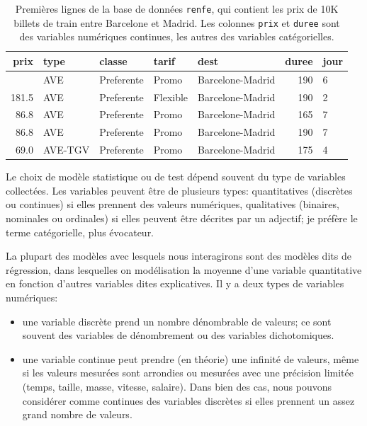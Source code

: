 \documentclass[
  11pt,
  letterpaper,
]{scrbook}
\providecommand{\tightlist}{%
  \setlength{\itemsep}{0pt}\setlength{\parskip}{0pt}}\usepackage{longtable,booktabs,array}
\theoremstyle{definition}
\theoremstyle{definition}
\theoremstyle{remark}
\begin{document}
\begin{longtable}[]{@{}rllllrl@{}}

\caption{\label{tbl-data-renfe}Premières lignes de la base de données
\texttt{renfe}, qui contient les prix de 10K billets de train entre
Barcelone et Madrid. Les colonnes \texttt{prix} et \texttt{duree} sont
des variables numériques continues, les autres des variables
catégorielles.}

\tabularnewline

\toprule\noalign{}
prix & type & classe & tarif & dest & duree & jour \\
\midrule\noalign{}
\endhead
\bottomrule\noalign{}
\endlastfoot
143.4 & AVE & Preferente & Promo & Barcelone-Madrid & 190 & 6 \\
181.5 & AVE & Preferente & Flexible & Barcelone-Madrid & 190 & 2 \\
86.8 & AVE & Preferente & Promo & Barcelone-Madrid & 165 & 7 \\
86.8 & AVE & Preferente & Promo & Barcelone-Madrid & 190 & 7 \\
69.0 & AVE-TGV & Preferente & Promo & Barcelone-Madrid & 175 & 4 \\

\end{longtable}

Le choix de modèle statistique ou de test dépend souvent du type de
variables collectées. Les variables peuvent être de plusieurs types:
quantitatives (discrètes ou continues) si elles prennent des valeurs
numériques, qualitatives (binaires, nominales ou ordinales) si elles
peuvent être décrites par un adjectif; je préfère le terme catégorielle,
plus évocateur.

La plupart des modèles avec lesquels nous interagirons sont des modèles
dits de régression, dans lesquelles on modélisation la moyenne d'une
variable quantitative en fonction d'autres variables dites explicatives.
Il y a deux types de variables numériques:

\begin{itemize}
\tightlist
\item
  une variable discrète prend un nombre dénombrable de valeurs; ce sont
  souvent des variables de dénombrement ou des variables dichotomiques.
\item
  une variable continue peut prendre (en théorie) une infinité de
  valeurs, même si les valeurs mesurées sont arrondies ou mesurées avec
  une précision limitée (temps, taille, masse, vitesse, salaire). Dans
  bien des cas, nous pouvons considérer comme continues des variables
  discrètes si elles prennent un assez grand nombre de valeurs.
\end{itemize}
\end{document}

